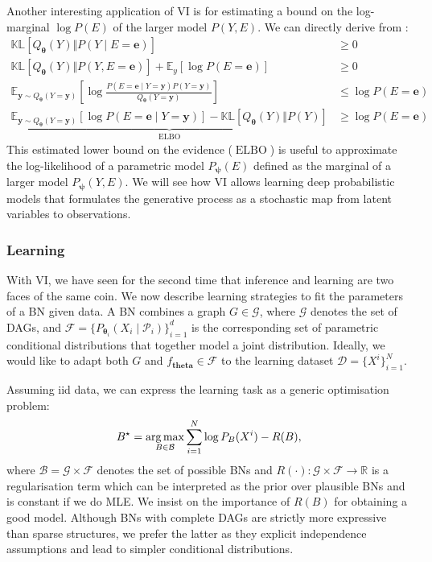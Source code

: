 Another interesting application of VI is for estimating a bound on the log-marginal $\log P(E)$ of the larger model $P(Y, E)$. We can directly derive from :
\begin{align}
  \mathbb{KL}\left[Q_{\bm{\theta}}(Y)\Vert P(Y\mid E=\bm{e})\right] &\geq 0\\
  \mathbb{KL}\left[Q_{\bm{\theta}}(Y)\Vert P(Y, E=\bm{e}) \right] + \mathbb{E}_{y}\left[\log P(E=\bm{e})\right] &\geq 0\\
  \mathbb{E}_{\bm y \sim Q_{\bm{\theta}}(Y=\bm{y})}\left[ \log \frac{P(E=\bm{e}\mid Y=\bm{y}) P(Y=\bm{y})}{Q_{\bm{\theta}}(Y=\bm{y})} \right] &\leq \log P(E=\bm{e})\\
  \underbrace{\mathbb{E}_{\bm y \sim Q_{\bm{\theta}}(Y=\bm{y})}\left[ \log P(E=\bm{e}\mid Y=\bm{y})\right] - \mathbb{KL}\left[Q_{\bm{\theta}}(Y)\Vert P(Y)\right]}_{\operatorname{ELBO}} &\geq \log P(E=\bm{e}) \label{eq:elbo}
\end{align}
This estimated lower bound on the evidence ($\operatorname{ELBO}$) is useful to approximate the log-likelihood of a parametric model $P_{\bm \psi}(E)$ defined as the marginal of a larger model $P_{\bm \psi}(Y, E)$.
We will see how VI allows learning deep probabilistic models that formulates the generative process as a stochastic map from latent variables to observations.
\subsubsection{Learning}
With VI, we have seen for the second time that inference and learning are two faces of the same coin. We now describe learning strategies to fit the parameters of a BN given data.
A BN combines a graph $G \in \mathcal{G}$, where $\mathcal{G}$ denotes the set of DAGs, and $\mathcal{F} = \{P_{\bm{\theta}_i}(X_i\mid \mathcal{P}_i)\}_{i=1}^d$ is the corresponding set of parametric conditional distributions that together model a joint distribution. Ideally, we would like to adapt both $G$ and $f_{\bm{theta}} \in \mathcal{F}$ to the learning dataset $\mathcal{D}=\{X^i\}_{i=1}^N$.

Assuming iid data, we can express the learning task as a generic optimisation problem:
\begin{align}
  B^\star  = \operatorname*{arg\,max}_{B\in\mathcal{B}} \sum_{i=1}^N \log P_B(X^i) - R(B), \label{eq:learn_BN}
\end{align}
where $\mathcal{B} = \mathcal{G} \times \mathcal{F}$ denotes the set of possible BNs and $R(\cdot): \mathcal{G} \times \mathcal{F} \rightarrow \mathbb{R}$ is a regularisation term which can be interpreted as the prior over plausible BNs and is constant if we do MLE. We insist on the importance of $R(B)$ for obtaining a good model. Although BNs with complete DAGs are strictly more expressive than sparse structures, we prefer the latter as they explicit independence assumptions and lead to simpler conditional distributions.

